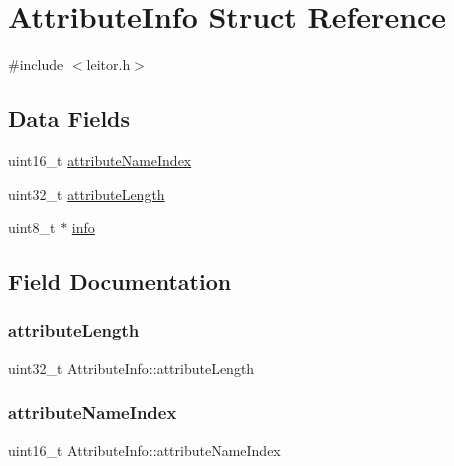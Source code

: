 \hypertarget{structAttributeInfo}{}\section{Attribute\+Info Struct Reference}
\label{structAttributeInfo}


{\ttfamily \#include $<$leitor.\+h$>$}

\subsection*{Data Fields}
\begin{DoxyCompactItemize}
\item 
uint16\+\_\+t \hyperlink{structAttributeInfo_ac0d9d9ffa3214f362c4e06df78036d6e}{attribute\+Name\+Index}
\item 
uint32\+\_\+t \hyperlink{structAttributeInfo_a1755dec7721e0e62a53c698831ba514d}{attribute\+Length}
\item 
uint8\+\_\+t $\ast$ \hyperlink{structAttributeInfo_a29031abd0ae7fd3a55950616e5368dd2}{info}
\end{DoxyCompactItemize}


\subsection{Field Documentation}
\mbox{\label{structAttributeInfo_a1755dec7721e0e62a53c698831ba514d}} 
\subsubsection{\texorpdfstring{attribute\+Length}{attributeLength}}
{\footnotesize\ttfamily uint32\+\_\+t Attribute\+Info\+::attribute\+Length}

\mbox{\label{structAttributeInfo_ac0d9d9ffa3214f362c4e06df78036d6e}} 
\subsubsection{\texorpdfstring{attribute\+Name\+Index}{attributeNameIndex}}
{\footnotesize\ttfamily uint16\+\_\+t Attribute\+Info\+::attribute\+Name\+Index}

